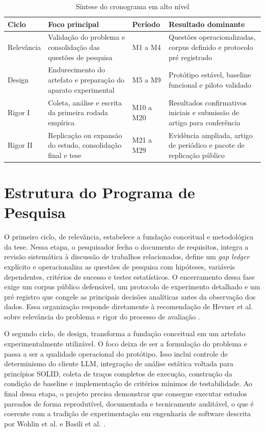 \documentclass[12pt,a4paper]{article}
\begin{document}
\begin{table}[htbp]
\centering
\caption{Síntese do cronograma em alto nível}
\label{tab:visao-geral}
\small
\begin{tabularx}{\textwidth}{>{\raggedright\arraybackslash}p{3.2cm} >{\raggedright\arraybackslash}p{3.2cm} >{\raggedright\arraybackslash}p{2.7cm} X}
\toprule
\textbf{Ciclo} & \textbf{Foco principal} & \textbf{Período} & \textbf{Resultado dominante} \\
\midrule
Relevância & Validação do problema e consolidação das questões de pesquisa & M1 a M4 & Questões operacionalizadas, corpus definido e protocolo pré registrado \\
Design & Endurecimento do artefato e preparação do aparato experimental & M5 a M9 & Protótipo estável, baseline funcional e piloto validado \\
Rigor I & Coleta, análise e escrita da primeira rodada empírica & M10 a M20 & Resultados confirmativos iniciais e submissão de artigo para conferência \\
Rigor II & Replicação ou expansão do estudo, consolidação final e tese & M21 a M29 & Evidência ampliada, artigo de periódico e pacote de replicação público \\
\bottomrule
\end{tabularx}
\end{table}

\section{Estrutura do Programa de Pesquisa}

O primeiro ciclo, de relevância, estabelece a fundação conceitual e metodológica da tese. Nessa etapa, o pesquisador fecha o documento de requisitos, integra a revisão sistemática à discussão de trabalhos relacionados, define um \textit{gap ledger} explícito e operacionaliza as questões de pesquisa com hipóteses, variáveis dependentes, critérios de sucesso e testes estatísticos. O encerramento dessa fase exige um corpus público defensável, um protocolo de experimento detalhado e um pré registro que congele as principais decisões analíticas antes da observação dos dados. Essa organização responde diretamente à recomendação de Hevner et al. sobre relevância do problema e rigor do processo de avaliação \cite{hevner2004}.

O segundo ciclo, de design, transforma a fundação conceitual em um artefato experimentalmente utilizável. O foco deixa de ser a formulação do problema e passa a ser a qualidade operacional do protótipo. Isso inclui controle de determinismo do cliente LLM, integração de análise estática voltada para princípios SOLID, coleta de traços completos de execução, construção da condição de baseline e implementação de critérios mínimos de testabilidade. Ao final dessa etapa, o projeto precisa demonstrar que consegue executar estudos pareados de forma reprodutível, documentada e tecnicamente auditável, o que é coerente com a tradição de experimentação em engenharia de software descrita por Wohlin et al. e Basili et al. \cite{wohlin2012, basili1986}.
\end{document}
